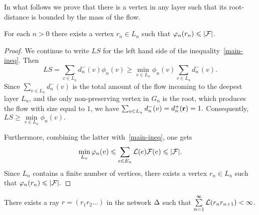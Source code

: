 \documentclass[12pt,oneside,a4paper]{amsart}
\begin{document}
          In what follows we prove that there is a vertex in any layer such that its root-distance is bounded by the mass of the flow.
          \begin{prop}
            \label{prop36}
            For each $n > 0$ there exists a vertex $r_n \in L_n$ such that $\varphi_n(r_n) \leqslant \lvert\mathcal{F}\rvert$.
          \end{prop}
          \begin{proof}
            We continue to write $LS$ for the left hand side of the inequality~\eqref{main-ineq}.
            Then
            \[
              LS = \sum_{v \in L_n}d^{-}_n(v) \phi_n(v) \geq \min_{v \in L_n}\phi_n(v) \sum_{v \in L_n} d^{-}_n(v).
            \]
            Since $\sum_{v \in L_n} d^{-}_n(v)$ is the total amount of the flow incoming to the deepest layer $L_n$, and the only
              non-preserving vertex in $G_n$ is the root, which produces the flow with size equal to $1$, we have $\sum_{v \in L_n} d^{-}_n(v) = d^{+}_n(\mathbf{r}) = 1.$
            Consequently, $LS \geq \min\limits_{v \in L_n} \phi_n(v).$

            Furthermore, combining the latter with~\eqref{main-ineq}, one gets
              \[
              \min_{L_n} \varphi_n(v) \leqslant \sum_{e \in E_n} \mathcal{L}(e) \mathcal{F}(e) \leqslant \lvert\mathcal{F}\rvert.
              \]
            Since $L_n$ contains a finite number of vertices, there exists a vertex $r_n \in L_n$ such that
              $\varphi_n(r_n) \leqslant \lvert\mathcal{F}\rvert.$
          \end{proof}
          \begin{prop}
            There exists a ray $r=(r_1 r_2\dots)$ in the network $\Delta$ such that $\sum\limits_{n=1}^\infty \mathcal{L}(r_n r_{n+1}) < \infty$.
          \end{prop}
\end{document}
